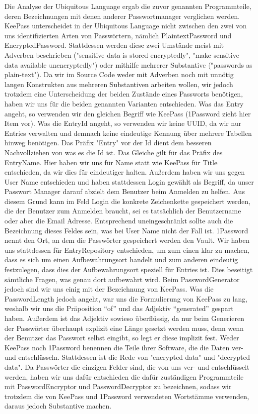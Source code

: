 Die Analyse der Ubiquitous Language ergab die zuvor genannten Programmteile, deren Bezeichnungen mit denen anderer Passwortmanager verglichen werden. KeePass unterscheidet in der Ubiquitous Language nicht zwischen den zwei von uns identifizierten Arten von Passwörtern, nämlich PlaintextPassword und EncryptedPassword. Stattdessen werden diese zwei Umstände meist mit Adverben beschrieben ("sensitive data is stored encryptedly", "make sensitive data available unencryptedly") oder mithilfe mehrerer Substantive ("passwords as plain-text"). Da wir im Source Code weder mit Adverben noch mit unnötig langen Konstrukten aus mehreren Substantiven arbeiten wollen, wir jedoch trotzdem eine Unterscheidung der beiden Zustände eines Passworts benötigen, haben wir uns für die beiden genannten Varianten entschieden. Was das Entry angeht, so verwenden wir den gleichen Begriff wie KeePass (1Password zieht hier Item vor). Was die EntryId angeht, so verwenden wir keine UUID, da wir nur Entries verwalten und demnach keine eindeutige Kennung über mehrere Tabellen hinweg benötigen. Das Präfix "Entry" vor der Id dient dem besseren Nachvollziehen von was es die Id ist. Das Gleiche gilt für das Präfix des EntryName. Hier haben wir uns für Name statt wie KeePass für Title entschieden, da wir dies für eindeutiger halten. Außerdem haben wir uns gegen User Name entschieden und haben stattdessen Login gewählt als Begriff, da unser Passwort Manager darauf abzielt dem Benutzer beim Anmelden zu helfen. Aus diesem Grund kann im Feld Login die konkrete Zeichenkette gespeichert werden, die der Benutzer zum Anmelden braucht, sei es tatsächlich der Benutzername oder aber die Email Adresse. Entsprechend uneingeschränkt sollte auch die Bezeichnung dieses Feldes sein, was bei User Name nicht der Fall ist. 1Password nennt den Ort, an dem die Passwörter gespeichert werden den Vault. Wir haben uns stattdessen für EntryRepository entschieden, um zum einen klar zu machen, dass es sich um einen Aufbewahrungsort handelt und zum anderen eindeutig festzulegen, dass dies der Aufbewahrungsort speziell für Entries ist. Dies beseitigt sämtliche Fragen, was genau dort aufbewahrt wird. Beim PasswordGenerator jedoch sind wir uns einig mit der Bezeichnung von KeePass. Was die PasswordLength jedoch angeht, war uns die Formulierung von KeePass zu lang, weshalb wir uns die Präposition \enquote{of} und das Adjektiv \enquote{generated} gespart haben. Außerdem ist das Adjektiv sowieso überflüssig, da nur beim Generieren der Passwörter überhaupt explizit eine Länge gesetzt werden muss, denn wenn der Benutzer das Passwort selbst eingibt, so legt er diese implizit fest. Weder KeePass noch 1Password benennen die Teile ihrer Software, die die Daten ver- und entschlüsseln. Stattdessen ist die Rede von "encrypted data" und "decrypted data". Da Passwörter die einzigen Felder sind, die von uns ver- und entschlüsselt werden, haben wir uns dafür entschieden die dafür zuständigen Programmteile mit PasswordEncryptor und PasswordDecryptor zu bezeichnen, sodass wir trotzdem die von KeePass und 1Password verwendeten Wortstämme verwenden, daraus jedoch Substantive machen.

